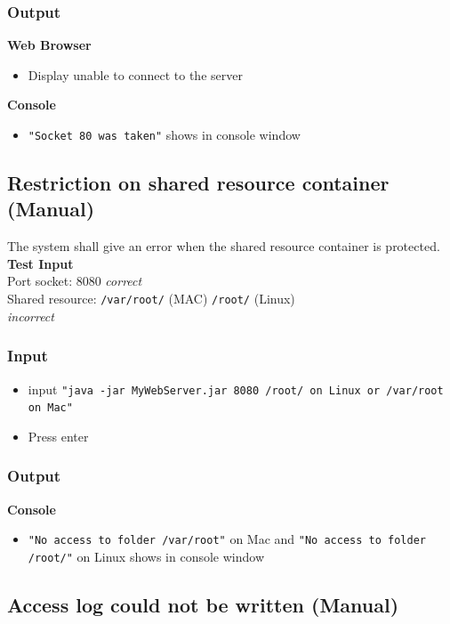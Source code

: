 \documentclass[a4paper, 12pt]{article}
\begin{document}
\subsubsection{Output}
\textbf{Web Browser}
\begin{itemize}
\item Display unable to connect to the server
\end{itemize}

\textbf{Console}
\begin{itemize}
\item \texttt{"Socket 80 was taken"} shows in console window
\end{itemize}

\subsection{Restriction on shared resource container (Manual)}

The system shall give an error when the shared resource container is protected.\\
\textbf{Test Input} \\ Port socket: 8080 \textit{correct} \\ Shared resource: \texttt{/var/root/} (MAC) \texttt{/root/} (Linux) \\ \textit{incorrect}
 
\subsubsection{Input}
\begin{itemize}
\item input \texttt{"java -jar MyWebServer.jar 8080 /root/ on Linux or /var/root on Mac"}
\item Press enter
\end{itemize} 

\subsubsection{Output}
\textbf{Console}
\begin{itemize}
\item \texttt{"No access to folder /var/root"} on Mac and \texttt{"No access to folder /root/"} on Linux shows in console window
\end{itemize}

\subsection{Access log could not be written (Manual)}
\end{document}

